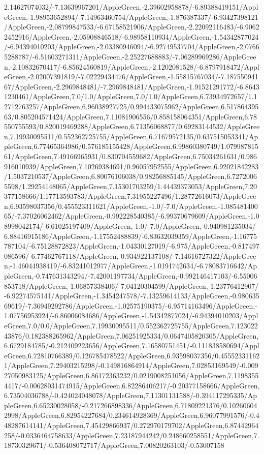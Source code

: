 {\begin{tikzternal}
2.14627074032/-7.13639967201/AppleGreen,-2.39602958878/-6.89388419151/AppleGreen,-1.98953652894/-7.14963460754/AppleGreen,-1.876387337/-6.93427398121/AppleGreen,-2.08799847533/-6.67158521906/AppleGreen,-2.22092116483/-6.90622452916/AppleGreen,-2.05908846518/-6.98958110934/AppleGreen,-1.54342877024/-6.94394010203/AppleGreen,-2.03380946094/-6.92749537704/AppleGreen,-2.07665288787/-6.51603271311/AppleGreen,-2.25227688883/-7.06289969286/AppleGreen,-2.10832670417/-6.85624560819/AppleGreen,-2.1202081528/-6.8797918472/AppleGreen,-2.02007391819/-7.02229434476/AppleGreen,-1.55815767034/-7.18755094167/AppleGreen,-2.2969848481/-7.2969848481/AppleGreen,-1.91521291772/-6.86431230461/AppleGreen,7.0/1.0/AppleGreen,7.0/1.0/AppleGreen,6.73934972657/1.12712763257/AppleGreen,6.96038927725/0.994433075962/AppleGreen,6.51786439563/0.805204571424/AppleGreen,7.11081906556/0.858158064351/AppleGreen,6.78550755593/0.820019469288/AppleGreen,6.71356068877/0.69283144532/AppleGreen,7.19930095511/0.552362725755/AppleGreen,6.71679572135/0.637515053341/AppleGreen,6.77465364986/0.576185155428/AppleGreen,6.99860380749/1.07998781561/AppleGreen,7.49166965931/0.830704559682/AppleGreen,6.75034261631/0.986916010939/AppleGreen,7.10269384691/0.96057952555/AppleGreen,6.92021842283/1.5037210537/AppleGreen,6.80076106038/0.98256885145/AppleGreen,6.72720065598/1.29254148065/AppleGreen,7.15301703259/1.44439373053/AppleGreen,7.20377158666/1.17713593783/AppleGreen,7.31955227496/1.28772616073/AppleGreen,6.93598037356/0.455523311621/AppleGreen,-1.0/-7.0/AppleGreen,-1.08548140065/-7.37026062462/AppleGreen,-0.992228540385/-6.99370679609/AppleGreen,-1.08998042174/-6.61025197409/AppleGreen,-1.0/-7.0/AppleGreen,-0.940981235034/-6.88416915186/AppleGreen,-1.17552488839/-6.83632039359/AppleGreen,-1.16775787104/-6.75128872823/AppleGreen,-1.04330127019/-6.975/AppleGreen,-0.817497086596/-6.77462767118/AppleGreen,-0.934922137108/-7.14616727322/AppleGreen,-1.46044938419/-6.83241012977/AppleGreen,-1.0191742634/-6.78083716642/AppleGreen,-0.747631343294/-7.42001197734/AppleGreen,-0.992146417103/-6.55006853718/AppleGreen,-1.06857338406/-7.04120304599/AppleGreen,-1.23776412907/-6.92274575141/AppleGreen,-1.3454247578/-7.13259614133/AppleGreen,-0.98063569619/-7.36949292786/AppleGreen,-1.02575190375/-6.95714163496/AppleGreen,-1.07756953924/-6.86006084686/AppleGreen,-1.54342877024/-6.94394010203/AppleGreen,7.0/0.0/AppleGreen,7.19930095511/0.552362725755/AppleGreen,7.12302243876/0.182388265962/AppleGreen,7.06251925334/0.0647405820305/AppleGreen,6.6729184785/-0.212409223656/AppleGreen,7.16580751451/-0.111838580694/AppleGreen,6.72810766389/0.126785478522/AppleGreen,6.93598037356/0.455523311621/AppleGreen,7.29403215298/-0.149816864914/AppleGreen,7.02853169549/-0.00927050983125/AppleGreen,6.86172363232/0.0219008251056/AppleGreen,7.11983554417/-0.00628031474915/AppleGreen,6.82286406217/-0.20377158666/AppleGreen,6.73504036788/-0.424024048078/AppleGreen,7.11301131588/-0.394117295335/AppleGreen,6.65230028058/-0.217266898336/AppleGreen,6.71809221376/0.102606042998/AppleGreen,6.82954227684/0.234614928369/AppleGreen,6.96077991576/-0.448287614141/AppleGreen,7.45429866937/0.272970179702/AppleGreen,6.87442964258/-0.0336464758633/AppleGreen,7.23187944242/0.248660258551/AppleGreen,7.18730329671/-0.536408072717/AppleGreen,7.00820263103/-0.53007158
\end{tikzternal}}
